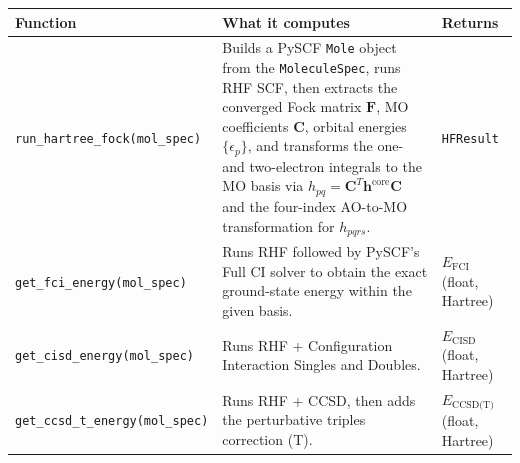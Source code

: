 \documentclass[
  11pt,
]{report}
\newcounter{none} %
\begin{document}
{\def\LTcaptype{none} %
\begin{longtable}[]{@{}
  >{\raggedright\arraybackslash}p{}
  >{\raggedright\arraybackslash}p{}
  >{\raggedright\arraybackslash}p{}@{}}
\toprule\noalign{}
\begin{minipage}[b]{\linewidth}\raggedright
Function
\end{minipage} & \begin{minipage}[b]{\linewidth}\raggedright
What it computes
\end{minipage} & \begin{minipage}[b]{\linewidth}\raggedright
Returns
\end{minipage} \\
\midrule\noalign{}
\endhead
\bottomrule\noalign{}
\endlastfoot
\texttt{run\_hartree\_fock(mol\_spec)} & Builds a PySCF \texttt{Mole}
object from the \texttt{MoleculeSpec}, runs RHF SCF, then extracts the
converged Fock matrix \(\mathbf{F}\), MO coefficients \(\mathbf{C}\),
orbital energies \(\{\epsilon_p\}\), and transforms the one- and
two-electron integrals to the MO basis via
\(h_{pq} = \mathbf{C}^T \mathbf{h}^{\text{core}} \mathbf{C}\) and the
four-index AO-to-MO transformation for \(h_{pqrs}\). &
\texttt{HFResult} \\
\texttt{get\_fci\_energy(mol\_spec)} & Runs RHF followed by PySCF's Full
CI solver to obtain the exact ground-state energy within the given
basis. & \(E_{\text{FCI}}\) (float, Hartree) \\
\texttt{get\_cisd\_energy(mol\_spec)} & Runs RHF + Configuration
Interaction Singles and Doubles. & \(E_{\text{CISD}}\) (float,
Hartree) \\
\texttt{get\_ccsd\_t\_energy(mol\_spec)} & Runs RHF + CCSD, then adds
the perturbative triples correction (T). & \(E_{\text{CCSD(T)}}\)
(float, Hartree) \\
\end{longtable}
}
\end{document}

